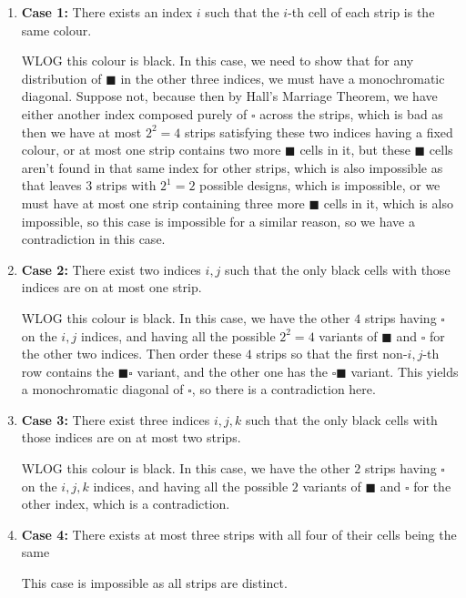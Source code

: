 \documentclass[10pt]{article}
\newcommand{\ws}{\square}
\newcommand{\bs}{\blacksquare}
\begin{document}
	\begin{enumerate}
	\item \textbf{Case 1:} There exists an index $i$ such that the $i$-th cell of each strip is the same colour.
	
	WLOG this colour is black. In this case, we need to show that for any distribution of \(\bs\) in the other three indices, we must have a monochromatic diagonal. Suppose not, because then by Hall's Marriage Theorem, we have either another index composed purely of \(\ws\) across the strips, which is bad as then we have at most $2^2 = 4$ strips satisfying these two indices having a fixed colour, or at most one strip contains two more \(\bs\) cells in it, but these \(\bs\) cells aren't found in that same index for other strips, which is also impossible as that leaves $3$ strips with $2^1 = 2$ possible designs, which is impossible, or we must have at most one strip containing three more \(\bs\) cells in it, which is also impossible, so this case is impossible for a similar reason, so we have a contradiction in this case.
	
	\item \textbf{Case 2:} There exist two indices $i, j$ such that the only black cells with those indices are on at most one strip.
	
	WLOG this colour is black. In this case, we have the other $4$ strips having \(\ws\) on the $i, j$ indices, and having all the possible $2^2 = 4$ variants of \(\bs\) and \(\ws\) for the other two indices. Then order these $4$ strips so that the first non-$i, j$-th row contains the $\bs \ws$ variant, and the other one has the $\ws \bs$ variant. This yields a monochromatic diagonal of \(\ws\), so there is a contradiction here.
	
	\item \textbf{Case 3:} There exist three indices $i, j, k$ such that the only black cells with those indices are on at most two strips.
	
	WLOG this colour is black. In this case, we have the other $2$ strips having \(\ws\) on the $i, j, k$ indices, and having all the possible $2$ variants of \(\bs\) and \(\ws\) for the other index, which is a contradiction.
	
	\item \textbf{Case 4:} There exists at most three strips with all four of their cells being the same
	
	This case is impossible as all strips are distinct.
	\end{enumerate}
	
\end{document}
